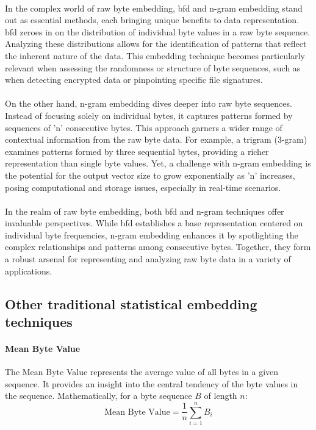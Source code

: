         \paragraph{}In the complex world of raw byte embedding, \acrfull{bfd} and n-gram embedding stand out as essential methods, each bringing unique benefits to data representation. \acrshort{bfd} zeroes in on the distribution of individual byte values in a raw byte sequence. Analyzing these distributions allows for the identification of patterns that reflect the inherent nature of the data. This embedding technique becomes particularly relevant when assessing the randomness or structure of byte sequences, such as when detecting encrypted data or pinpointing specific file signatures.

        \paragraph{}On the other hand, n-gram embedding dives deeper into raw byte sequences. Instead of focusing solely on individual bytes, it captures patterns formed by sequences of 'n' consecutive bytes. This approach garners a wider range of contextual information from the raw byte data. For example, a trigram (3-gram) examines patterns formed by three sequential bytes, providing a richer representation than single byte values. Yet, a challenge with n-gram embedding is the potential for the output vector size to grow exponentially as 'n' increases, posing computational and storage issues, especially in real-time scenarios.
        
        \paragraph{}In the realm of raw byte embedding, both \acrshort{bfd} and n-gram techniques offer invaluable perspectives. While \acrshort{bfd} establishes a base representation centered on individual byte frequencies, n-gram embedding enhances it by spotlighting the complex relationships and patterns among consecutive bytes. Together, they form a robust arsenal for representing and analyzing raw byte data in a variety of applications.
    \subsection{Other traditional statistical embedding techniques}
        \paragraph{Mean Byte Value}The Mean Byte Value represents the average value of all bytes in a given sequence. It provides an insight into the central tendency of the byte values in the sequence. Mathematically, for a byte sequence \( B \) of length \( n \):
        \begin{equation}
        \text{Mean Byte Value} = \frac{1}{n} \sum_{i=1}^{n} B_i
        \label{eq:mean_byte_value}
        \end{equation}

